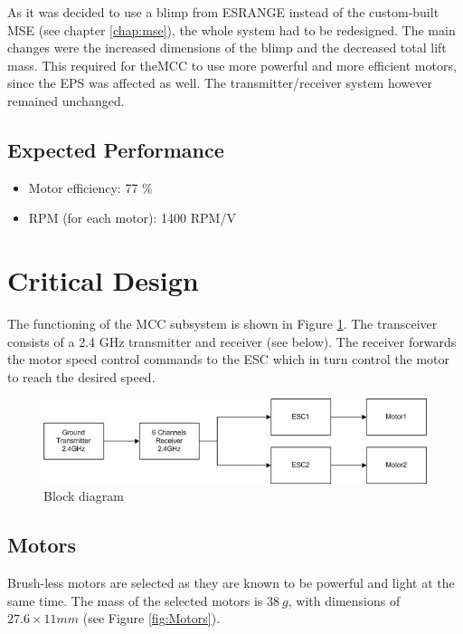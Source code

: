 \noindent
As it was decided to use a blimp from ESRANGE instead of the custom-built \ac{MSE} (see chapter \ref{chap:mse}), the whole system had to be redesigned. The main changes were the increased dimensions of the blimp and the decreased total lift mass. This required for the\ac{MCC} to use more powerful and more efficient motors, since the \ac{EPS} was affected as well. The transmitter/receiver system however remained unchanged.

\subsection{Expected Performance}

\begin{itemize}
\item Motor efficiency: 77 \% 
\item RPM (for each motor): 1400 RPM/V
\end{itemize}

\section{Critical Design}

The functioning of the \ac{MCC} subsystem is shown in Figure \ref{fig:design_block}. The transceiver consists of a 2.4 GHz transmitter and receiver (see below). The receiver forwards the motor speed control commands to the \ac{ESC} which in turn control the motor to reach the desired speed.

\begin{figure}[h!]
\centering
\includegraphics[scale=0.8]{figures/blockdiagram.jpg}
\caption{Block diagram}
\label{fig:design_block}
\end{figure}

\subsection{Motors}

Brush-less motors are selected as they are known to be powerful and light at the same time. The mass of the selected motors is $38\ g$, with dimensions of $27.6 \times 11 mm$ (see Figure \ref{fig:Motors}).

